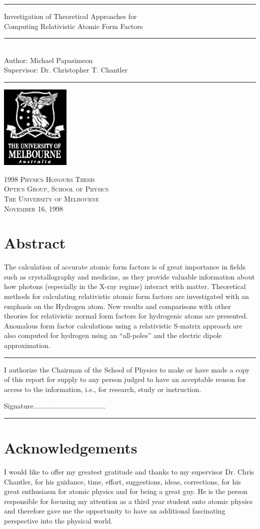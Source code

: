 \documentclass[a4paper,titlepage]{sfreport}
\newcommand{\HRule}{\rule{\textwidth}{1mm}}
\newcommand{\Trule}{\rule{\textwidth}{0.1pt}}
\newcommand{\maketitlepage}[2]{
    \begin{titlepage}
    \vspace*{\stretch{1}}
    \HRule
\begin{center}
        {\textsf{{ \huge  #1} }}
        \\[5mm]
        \Trule
        \\[5mm]
        \Large \textsf{#2}
\end{center}
    \HRule
    \vspace*{\stretch{2}}
    \begin{center}
        \includegraphics[height=4cm]{UMCrest97.eps}
    \end{center}
    \begin{center}
        \Large\textsc{1998 Physics Honours Thesis \\
                      Optics Group, School of Physics\\
                      The University of Melbourne \\
                      November 16, 1998}
    \end{center}
    \end{titlepage}
}
\begin{document}
    \maketitlepage{Investigation of Theoretical Approaches for\\
                   \vspace{3mm} 
                   Computing Relativistic Atomic Form Factors}%
                   {Author: Michael Papasimeon 
                   \\[5mm]
                   Supervisor: Dr. Christopher T. Chantler} 

    \chapter*{Abstract}
    The calculation of accurate atomic form factors is of great importance in
    fields such as crystallography and medicine, as they provide valuable 
    information about how photons (especially in the X-ray regime)
    interact with matter.
    Theoretical methods for calculating relativistic atomic form factors 
    are investigated with an emphasis on the Hydrogen atom.
    New results and comparisons with other theories for relativistic normal form 
    factors for hydrogenic atoms are presented.
    Anomalous form factor calculations using a relativistic S-matrix approach
    are also computed for hydrogen using an ``all-poles'' and the electric
    dipole approximation.
    \vspace*{10cm}
    \hrule
    \vspace*{5mm}
    I authorize the Chairman of the School of Physics to make or have made a
    copy of this report for supply to any person judged to have an
    acceptable reason for access to the information, i.e., for research,
    study or instruction.
    \vspace*{10mm}
    \begin{flushright}
    Signature.....................................
    \end{flushright}
    \vspace*{5mm}
    \hrule

    \chapter*{Acknowledgements}
    I would like to offer my greatest gratitude and thanks to my supervisor 
    Dr. Chris Chantler, for his guidance, time, effort, suggestions, ideas, corrections,
    for his great enthusiasm for atomic physics and for being a great guy.
    He is the person responsible for focusing my attention as a third year
    student onto atomic physics and therefore gave me the opportunity
    to have an additional fascinating perspective into the physical world.
\end{document}
